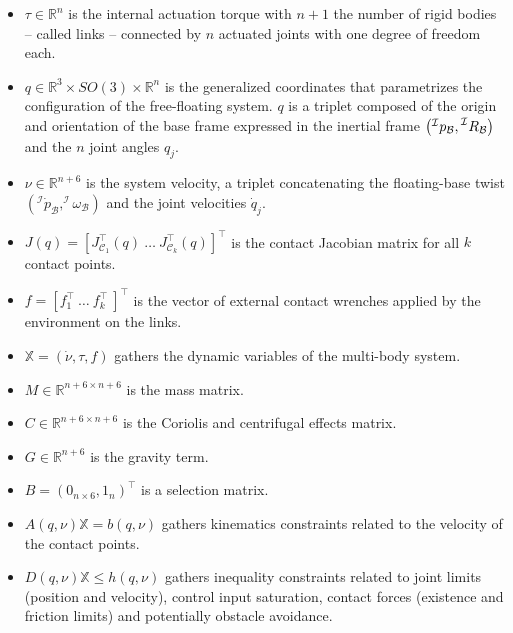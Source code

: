 \documentclass[12pt,a4paper,twoside]{article}
\begin{document}
\begin{itemize}
\item $\tau \in \mathbb{R}^n$ is the internal actuation torque with $n + 1$ the number of rigid bodies -- called links -- connected by $n$ actuated joints with one degree of freedom each.
\item ${q} \in \mathbb{R}^3 \times SO(3)\times \mathbb{R}^n$ is the generalized coordinates that parametrizes the configuration of the free-floating system. $q$ is a triplet composed of the origin and orientation of the base frame expressed in the inertial frame $\left(\prescript{\mathcal{I}}{}p_{\mathcal{B}},\prescript{\mathcal{I}}{}R_{\mathcal{B}}\right)$ and the $n$ joint angles $q_j$.
\item ${\nu} \in \mathbb{R}^{n+6}$ is the system velocity, a triplet concatenating the floating-base twist $\left (^\mathcal{I}\dot{ p}_{\mathcal{B}},^\mathcal{I}\omega_{\mathcal{B}}\right)$ and the joint velocities ${\dot{q}}_j$.
\item ${J}({q})= \left[{J}^\top _{\mathcal{C}_1}({q})~ \dots~ {J}^\top _{\mathcal{C}_k}({q}) \right]^\top$ is the contact Jacobian matrix for all $k$ contact points.
\item $f= \left[ {f}^\top_{1}~ \dots~ {f}^\top_{k}~ \right]^\top $ is the vector of external contact wrenches applied by the environment on the links.
\item $\mathbb{X} = \left(\dot{\nu}, \tau, f \right)$ gathers the dynamic variables of the multi-body system.
\item ${M} \in \mathbb{R}^{n+6 \times n+6}$ is the mass matrix.
\item ${C} \in \mathbb{R}^{n+6 \times n+6}$ is the Coriolis and centrifugal effects matrix.
\item ${G} \in \mathbb{R}^{n+6}$ is the gravity term.
\item $B = (0_{n\times 6} , 1_n)^\top$ is a selection matrix.
\item ${A}(q,\nu) \mathbb{X}   =  {b}(q,\nu)$ gathers kinematics constraints related to the velocity of the contact points.
\item ${D}(q,\nu) \mathbb{X} \leq {h}(q,\nu)$ gathers inequality constraints related to joint limits (position and velocity), control input saturation, contact forces (existence and friction limits) and potentially obstacle avoidance.
\end{itemize}
\end{document}
